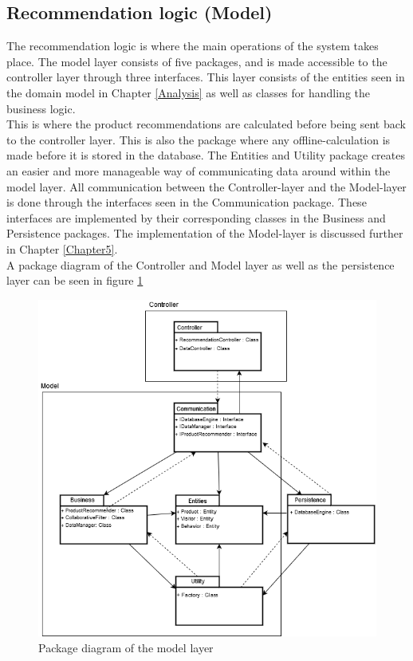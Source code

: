 \subsection{Recommendation logic (Model)}
The recommendation logic is where the main operations of the system takes place. The model layer consists of five packages, and is made accessible to the controller layer through three interfaces. This layer consists of the entities seen in the domain model in Chapter \ref{Analysis} as well as classes for handling the business logic. \\This is where the product recommendations are calculated before being sent back to the controller layer. This is also the package where any offline-calculation is made before it is stored in the database. The Entities and Utility package creates an easier and more manageable way of communicating data around within the model layer. All communication between the Controller-layer and the Model-layer is done through the interfaces seen in the Communication package. These interfaces are implemented by their corresponding classes in the Business and Persistence packages. The implementation of the Model-layer is discussed further in Chapter \ref{Chapter5}. \\
A package diagram of the Controller and Model layer as well as the persistence layer can be seen in figure \ref{fig:PackageDiagram}

\begin{figure}[H]
	\centering
	\includegraphics[width=.8\linewidth]{Figures/PackageDiagram.png}
	\caption{Package diagram of the model layer}
	\label{fig:PackageDiagram}
\end{figure}

